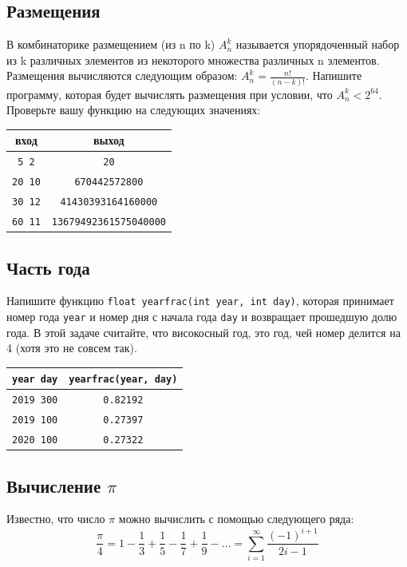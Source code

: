 \documentclass[10pt]{article}
\begin{document}
\subsection{Размещения}
В комбинаторике размещением (из n по k) $A_n^k$ называется упорядоченный набор из k различных элементов из некоторого множества различных n элементов. Размещения вычисляются следующим образом: $A_n^k = \frac{n!}{(n-k)!}$. Напишите программу, которая будет вычислять размещения при условии, что  $A_n^k < 2^{64}$. Проверьте вашу функцию на следующих значениях:
\begin{center}
\begin{tabular}{ c c }
 вход & выход \\ \hline
 \texttt{5 2} & \texttt{20}  \\ 
 \texttt{20 10} & \texttt{670442572800}  \\ 
 \texttt{30 12} & \texttt{41430393164160000} \\ 
 \texttt{60 11} & \texttt{13679492361575040000} \\   
\end{tabular}
\end{center}


\subsection{Часть года}
Напишите функцию \texttt{float yearfrac(int year, int day)}, которая принимает номер года \texttt{year} и номер дня с начала года \texttt{day} и возвращает прошедшую долю года. В этой задаче считайте, что високосный год, это год, чей номер делится на 4 (хотя это не совсем так).
\begin{center}
\begin{tabular}{ c c }
 \texttt{year day} & \texttt{yearfrac(year, day)} \\ \hline
 \texttt{2019 300} & \texttt{0.82192}  \\
 \texttt{2019 100} & \texttt{0.27397}  \\ 
 \texttt{2020 100} & \texttt{0.27322}  \\ 
\end{tabular}
\end{center}

\subsection{Вычисление $\pi$} 
Известно, что число $\pi$ можно вычислить с помощью следующего ряда:
$$
\frac{\pi}{4} = 1 - \frac{1}{3} + \frac{1}{5} - \frac{1}{7} + \frac{1}{9} - ... = \sum_{i=1}^{\infty} \frac{(-1)^{i + 1}}{2i-1}
$$
\end{document}
